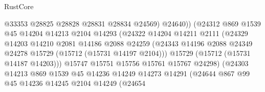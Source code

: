 \begin{lexlean}{RustCore}
\begin{coremodule}
                                      @33353
                                      @28825
                                      @28828
                                      @28831
                                      @28834
                                      @24569)
                                    @24640))
                                (@24312
                                  @869
                                  @1539
                                  @45
                                  @14204
                                  @14213
                                  @2104
                                  @14293
                                  (@24322
                                    @14204
                                    @14211
                                    @2111
                                    (@24329
                                      @14203
                                      @14210
                                      @2081
                                      @14186
                                      @2088
                                      @24259
                                      (@24343
                                        @14196
                                        @2088
                                        @24349
                                        @24278
                                        @15729
                                        (@15712 (@15731 @14197 @2104)))
                                      @15729
                                      (@15712 (@15731 @14187 @14203)))
                                    @15747
                                    @15751
                                    @15756
                                    @15761
                                    @15767
                                    @24298)
                                  (@24303
                                    @14213
                                    @869
                                    @1539
                                    @45
                                    @14236
                                    @14249
                                    @14273
                                    @14291
                                    (@24644
                                      @867
                                      @99
                                      @45
                                      @14236
                                      @14245
                                      @2104
                                      @14249
                                      (@24654

\end{coremodule}
\end{lexlean}
